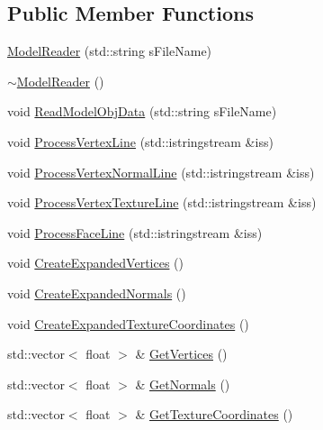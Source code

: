 \subsection*{Public Member Functions}
\begin{DoxyCompactItemize}
\item 
\hyperlink{class_model_reader_a9bcdfff98ff58c99dd089e4255a1e6a4}{Model\+Reader} (std\+::string s\+File\+Name)
\item 
\hyperlink{class_model_reader_a0ca7f69aa1af0ab52c43d83e8c0537de}{$\sim$\+Model\+Reader} ()
\item 
void \hyperlink{class_model_reader_a18575bb00920a495f718bdaea32d88d1}{Read\+Model\+Obj\+Data} (std\+::string s\+File\+Name)
\item 
void \hyperlink{class_model_reader_ab35aabd01b36f0f73849aa5d37269134}{Process\+Vertex\+Line} (std\+::istringstream \&iss)
\item 
void \hyperlink{class_model_reader_a4b70b7ce8745610b9c86cd30323827cf}{Process\+Vertex\+Normal\+Line} (std\+::istringstream \&iss)
\item 
void \hyperlink{class_model_reader_a937ab0dbfc1a7e45c200e8a0b520d677}{Process\+Vertex\+Texture\+Line} (std\+::istringstream \&iss)
\item 
void \hyperlink{class_model_reader_a4c89991dbe92b0adf34268e31ea249b4}{Process\+Face\+Line} (std\+::istringstream \&iss)
\item 
void \hyperlink{class_model_reader_ad488c2815537bdf59e67b5ea221c47f6}{Create\+Expanded\+Vertices} ()
\item 
void \hyperlink{class_model_reader_ada5347a6bc15931c74de786a6ccf51cc}{Create\+Expanded\+Normals} ()
\item 
void \hyperlink{class_model_reader_a08bf36b69771fea54a64c125af0dbf2f}{Create\+Expanded\+Texture\+Coordinates} ()
\item 
std\+::vector$<$ float $>$ \& \hyperlink{class_model_reader_acc0661952677fedcd92ac4d39eadc281}{Get\+Vertices} ()
\item 
std\+::vector$<$ float $>$ \& \hyperlink{class_model_reader_af72dcd34b82460711d6d1d56405ef532}{Get\+Normals} ()
\item 
std\+::vector$<$ float $>$ \& \hyperlink{class_model_reader_a041db1896d8ce51f653ba1590847de17}{Get\+Texture\+Coordinates} ()
\end{DoxyCompactItemize}
